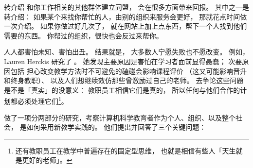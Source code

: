 \begin{aside}{转介绍}
  和你工作相关的其他群体建立同盟，
  会在很多方面带来回报。
  其中之一是转介绍：
  如果某个来找你帮忙的人，由别的组织来服务会更好，
  那就花点时间做一次介绍。
  如果你做过好几次了，
  就在网站上加上点东西，帮下一个人找到他们需要的东西。
  你帮过的组织，很快也会反过来帮你。
\end{aside}


人人都害怕未知、害怕出丑。
结果就是，
大多数人宁愿失败也不愿改变。
例如，Lauren Herckis 研究了
。
她发现主要原因是害怕在学习者面前显得愚蠢；
次要原因包括
担心改变教学方法时不可避免的磕碰会影响课程评价
（这又可能影响晋升和终身教职）、
以及人们想继续效仿那些曾激励过自己的老师。
去争论这些问题是不是「真实」的没意义：
教职员工相信它们是真的，
所以任何与他们合作的计划都必须处理它们\footnote{
  还有教职员工在教学中普遍存在的固定型思维，
  也就是相信有些人「天生就是更好的老师」。}。

\cite{Bark2015}做了一项分两部分的研究，考察计算机科学教育者作为个人、组织、以及整个社会，
是如何采用新教学实践的。
他们提出并回答了三个关键问题：

